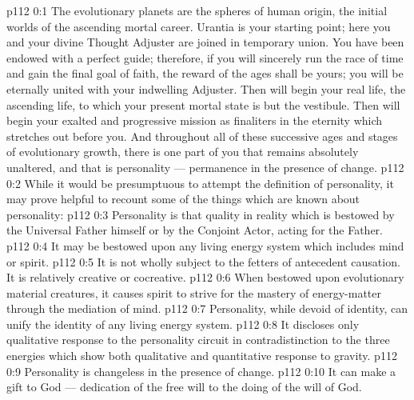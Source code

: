 \author{Solitary Messenger}
\vs p112 0:1 The evolutionary planets are the spheres of human origin, the initial worlds of the ascending mortal career. Urantia is your starting point; here you and your divine Thought Adjuster are joined in temporary union. You have been endowed with a perfect guide; therefore, if you will sincerely run the race of time and gain the final goal of faith, the reward of the ages shall be yours; you will be eternally united with your indwelling Adjuster. Then will begin your real life, the ascending life, to which your present mortal state is but the vestibule. Then will begin your exalted and progressive mission as finaliters in the eternity which stretches out before you. And throughout all of these successive ages and stages of evolutionary growth, there is one part of you that remains absolutely unaltered, and that is personality --- permanence in the presence of change.
\vs p112 0:2 \pc While it would be presumptuous to attempt the definition of personality, it may prove helpful to recount some of the things which are known about personality:
\vs p112 0:3 \bibnobreakspace Personality is that quality in reality which is bestowed by the Universal Father himself or by the Conjoint Actor, acting for the Father.
\vs p112 0:4 \bibnobreakspace It may be bestowed upon any living energy system which includes mind or spirit.
\vs p112 0:5 \bibnobreakspace It is not wholly subject to the fetters of antecedent causation. It is relatively creative or cocreative.
\vs p112 0:6 \bibnobreakspace When bestowed upon evolutionary material creatures, it causes spirit to strive for the mastery of energy\hyp{}matter through the mediation of mind.
\vs p112 0:7 \bibnobreakspace Personality, while devoid of identity, can unify the identity of any living energy system.
\vs p112 0:8 \bibnobreakspace It discloses only qualitative response to the personality circuit in contradistinction to the three energies which show both qualitative and quantitative response to gravity.
\vs p112 0:9 \bibnobreakspace Personality is changeless in the presence of change.
\vs p112 0:10 \bibnobreakspace It can make a gift to God --- dedication of the free will to the doing of the will of God.
